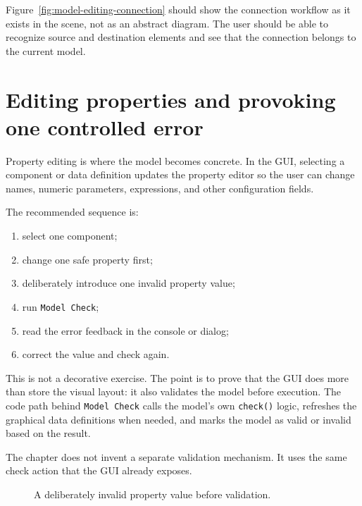 Figure~\ref{fig:model-editing-connection} should show the connection workflow as it exists in the scene,
not as an abstract diagram. The user should be able to recognize source and destination elements and
see that the connection belongs to the current model.

\section{Editing properties and provoking one controlled error}
\label{sec:model-editing-properties-and-validation}

Property editing is where the model becomes concrete. In the GUI, selecting a component or data
definition updates the property editor so the user can change names, numeric parameters, expressions,
and other configuration fields.

The recommended sequence is:
\begin{enumerate}
\item select one component;
\item change one safe property first;
\item deliberately introduce one invalid property value;
\item run \texttt{Model Check};
\item read the error feedback in the console or dialog;
\item correct the value and check again.
\end{enumerate}

This is not a decorative exercise. The point is to prove that the GUI does more than store the visual
layout: it also validates the model before execution. The code path behind \texttt{Model Check} calls the
model's own \texttt{check()} logic, refreshes the graphical data definitions when needed, and marks the
model as valid or invalid based on the result.

The chapter does not invent a separate validation mechanism. It uses the same check action that the GUI
already exposes.

\begin{figure}[htbp]
\centering
\caption{A deliberately invalid property value before validation.}
\label{fig:model-editing-invalid-property}
\end{figure}

